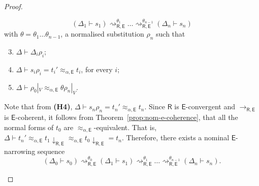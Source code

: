\documentclass[submission,copyright,creativecommons]{eptcs}
\newcommand{\ealeq}{\approx_{\alpha,\theory{E}}}
\newcommand{\alert}[1]{\textcolor{red}{#1}}
\newcommand{\theory}[1]{\ensuremath{\mathsf{#1}}}
\theoremstyle{plain}
\theoremstyle{definition}
\theoremstyle{remark}
\begin{document}
\begin{proof}
\begin{itemize}
    $$ (\Delta_1 \vdash s_1) \rightsquigarrow^{\theta_1}_{\theory{R,E}}  \ldots \rightsquigarrow^{\theta_{n-1}}_{\theory{R,E}} (\Delta_n \vdash s_n) $$
    with $\theta=\theta_1\ldots \theta_{n-1}$, a normalised substitution $\rho_n$ such that 
   \begin{enumerate}[{\bf (H1)}] 
   \setcounter{enumi}{2}
   \item $\Delta\vdash \Delta_i\rho_i$;
   \item  $\Delta \vdash s_i\rho_i =t_i'\ealeq t_i$, for every $i$; 
   \item $\Delta \vdash \rho_0|_V \ealeq \theta\rho_n|_V$. 
   \end{enumerate} 
   Note that from {\bf (H4)}, $\Delta\vdash s_n\rho_n=t_n'\ealeq t_n$. Since \theory{R} is \theory{E}-convergent and $\to_{\theory{R,E}}$ is \theory{E}-coherent, it follows from Theorem~\ref{prop:nom-e-coherence}, that all the normal forms  of $t_0$ are $\ealeq$-equivalent. That is, 
   $\Delta\vdash t_n'\ealeq t_1\downarrow_\theory{R,E}\ealeq t_0\downarrow_\theory{R,E}=t_n.$
    Therefore, there exists  a nominal \theory{E}-narrowing sequence
  $$(\Delta_0\vdash s_0) \rightsquigarrow^{\theta_0}_{\theory{R,E}} (\Delta_1 \vdash s_1) \rightsquigarrow^{\theta_1}_{\theory{R,E}}  \ldots \rightsquigarrow^{\theta_{n-1}}_{\theory{R,E}} (\Delta_n \vdash s_n).$$
\end{itemize}

    

\end{proof}
\end{document}
